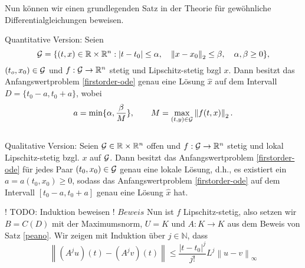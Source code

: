 Nun können wir einen grundlegenden Satz in der Theorie für gewöhnliche Differentialgleichungen beweisen.
\begin{satz}
\label{picard}
    Quantitative Version: Seien
    \[
            {\cal G}=\{(t,x) \in \mathbb{R} \times \mathbb{R}^{n}: |t-t_{0}| \leq \alpha, \quad
        \left\lVert x-x_{0} \right\rVert _{2} \leq\beta, \quad \alpha,\beta \geq 0 \},
    \]
    $(t_{o},x_{0})\in {\cal G}$ und $f:{\cal G} \rightarrow \mathbb{R}^{n}$ stetig und Lipschitz-stetig bzgl $x$.
    Dann besitzt das Anfangswertproblem \eqref{firstorder-ode} genau eine Lösung $\hat{x}$ auf dem Intervall
    $D=\{t_{0}-a,t_{0}+a\}$, wobei
    \[
        a=\min\{\alpha, \frac{\beta}{M}\}, \qquad M= \max_{(t,y)\in {\cal G}}\left\lVert f(t,x)\right\rVert_{2} .
    \]\\
    Qualitative Version: Seien ${\cal G}\in \mathbb{R} \times \mathbb{R}^{n}$ offen und $f:{\cal G} \rightarrow \mathbb{R}^{n}$ stetig
    und lokal Lipschitz-stetig bzgl. $x$ auf $\cal{G}$. Dann besitzt das Anfangswertproblem \eqref{firstorder-ode} für
    jedes Paar $(t_{0},x_{0}) \in {\cal G}$ genau eine lokale Lösung, d.h., es existiert ein $a=a(t_{0},x_{0}) \geq 0$,
    sodass das Anfangswertproblem \eqref{firstorder-ode} auf dem Intervall $[t_{0}-a,t_{0}+a]$ genau eine Lösung
    $\hat{x}$ hat.
\end{satz}
! TODO: Induktion beweisen !
$Beweis$ Nun ist $f$ Lipschitz-stetig, also setzen wir $B=C(D)$ mit der Maximumsnorm, $U=K$ und $A:K \rightarrow K$
aus dem Beweis von Satz \eqref{peano}. Wir zeigen mit Induktion über $j\in \mathbb{N}$, dass
\[
    \left\lVert (A^j u)(t) - (A^j v)(t) \right\rVert \leq \frac{|t-t_0|^j}{j!} L^j\left\lVert u - v \right\rVert_{\infty}
\]


